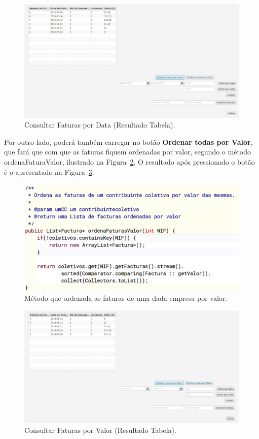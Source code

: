 \documentclass[a4paper]{article}
\begin{document}
\begin{itemize}
\begin{figure}[H]
\centering
\includegraphics[scale=0.3]{imgs/consultarFaturasData.png}
\caption{Consultar Faturas por Data (Resultado Tabela).}
\label{img:consultarFaturasData}
\end{figure}

Por outro lado, poderá também carregar no botão \textbf{Ordenar todas por Valor},
que fará que com que as faturas fiquem ordenadas por valor, segundo o método
\textsf{ordenaFaturaValor}, ilustrado na Figura~\ref{img:ordenaFaturaValor}.
O resultado após pressionado o botão é o apresentado na Figura~\ref{img:consultarFaturasValor}.

\begin{figure}[H]
\centering
\includegraphics[scale=0.35]{imgs/ordenaFaturaValor.png}
\caption{Método que ordenada as faturas de uma dada empresa por valor.}
\label{img:ordenaFaturaValor}
\end{figure}

\begin{figure}[H]
\centering
\includegraphics[scale=0.3]{imgs/consultarFaturasValor.png}
\caption{Consultar Faturas por Valor (Resultado Tabela).}
\label{img:consultarFaturasValor}
\end{figure}




\end{itemize}
\end{document}
